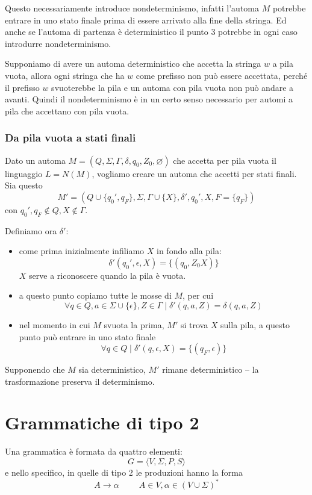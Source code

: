 \documentclass[12pt]{report}
\begin{document}
Questo necessariamente introduce nondeterminismo, infatti l'automa $M$ potrebbe entrare in uno stato finale prima di essere arrivato alla fine della stringa.
Ed anche se l'automa di partenza è deterministico il punto $3$ potrebbe in ogni caso introdurre nondeterminismo.

Supponiamo di avere un automa deterministico che accetta la stringa $w$ a pila vuota, allora ogni stringa che ha $w$ come prefisso non può essere accettata, perché il prefisso $w$ svuoterebbe la pila e un automa con pila vuota non può andare a avanti.
Quindi il nondeterminismo è in un certo senso necessario per automi a pila che accettano con pila vuota.

\subsubsection{Da pila vuota a stati finali}
Dato un automa $M = (Q, \Sigma, \Gamma,\delta, q_0, Z_0, \varnothing)$ che accetta per pila vuota il linguaggio $L = N(M)$, vogliamo creare un automa che accetti per stati finali.
Sia questo 
$$M' = (Q \cup \{q_0', q_F\}, \Sigma, \Gamma \cup \{X\}, \delta', q_0', X, F = \{q_F\})$$
con $q_0', q_F \not \in Q, X \not \in \Gamma$.

Definiamo ora $\delta'$:
\begin{itemize}
	\item come prima inizialmente infiliamo $X$ in fondo alla pila:
		$$ \delta'(q_0', \epsilon, X) = \{(q_0, Z_0X)\} $$
		$X$ serve a riconoscere quando la pila è vuota.
	\item a questo punto copiamo tutte le mosse di $M$, per cui
		$$ \forall q \in Q, a \in \Sigma \cup \{\epsilon\}, Z \in \Gamma \mid \delta'(q, a, Z) = \delta(q, a, Z) $$
	\item nel momento in cui $M$ svuota la prima, $M'$ si trova $X$ sulla pila, a questo punto può entrare in uno stato finale
		$$ \forall q \in Q \mid \delta'(q, \epsilon, X) = \{(q_F, \epsilon)\}$$
\end{itemize}
Supponendo che $M$ sia deterministico, $M'$ rimane deterministico -- la trasformazione preserva il determinismo.

\section{Grammatiche di tipo 2}
Una grammatica è formata da quattro elementi:
$$ G = \langle V, \Sigma, P, S \rangle $$
e nello specifico, in quelle di tipo 2 le produzioni hanno la forma
$$ A \rightarrow \alpha \hspace{1cm} A \in V, \alpha \in (V \cup \Sigma)^* $$
\end{document}
